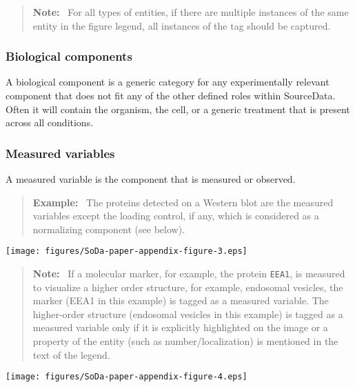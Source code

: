 \documentclass{bioinfo}
\newenvironment{note}
{\par\color{black}\begin{quote}\textbf{Note:}\ }
{\end{quote}\par}
\newenvironment{example}
{\par\color{black}\begin{quote}\textbf{Example:}\ }
{\end{quote}\par}
\begin{document}
\begin{note}
    For all types of entities, if there are multiple instances of the same entity in the figure legend, all instances of the tag should be captured.
\end{note}

\subsubsection{Biological components}\label{app:biological-components}
A biological component is a generic category for any experimentally relevant component that does not fit any of the other defined roles within SourceData. Often it will contain the organism, the cell, or a generic treatment that is present across all conditions.

\subsubsection{Measured variables}\label{app:assayed-components}
A measured variable is the component that is measured or observed.

\begin{example}
    The proteins detected on a Western blot are the measured variables except the loading control, if any, which is considered as a normalizing component (see below).
\end{example}

\begin{figure*}
    \centering
    \texttt{[image: figures/SoDa-paper-appendix-figure-3.eps]}
    \caption{In the example above, tubulin is the normalizing component.}
    \label{fig:normalizing_western}
\end{figure*}

\begin{note}
    If a molecular marker, for example, the protein \texttt{EEA1}, is measured to visualize a higher order structure, for example, endosomal vesicles, the marker (EEA1 in this example) is tagged as a measured variable. The higher-order structure (endosomal vesicles in this example) is tagged as a measured variable only if it is explicitly highlighted on the image or a property of the entity (such as number/localization) is mentioned in the text of the legend.
\end{note}

\begin{figure*}
    \centering
    \texttt{[image: figures/SoDa-paper-appendix-figure-4.eps]}
    \caption{In this case, \texttt{HDEL} is an ER marker, so it is captured as a measured variable. In addition, because there is a specific reference to the ER in the legend, ER is also captured as a measured variable. Note that in this example there is a second marker, \texttt{CMAC}, which is, however, a reporter as is therefore captured as a reporter for vacuole, which is labeled as a measured variable.}
    \label{fig:markers}
\end{figure*}
\end{document}
